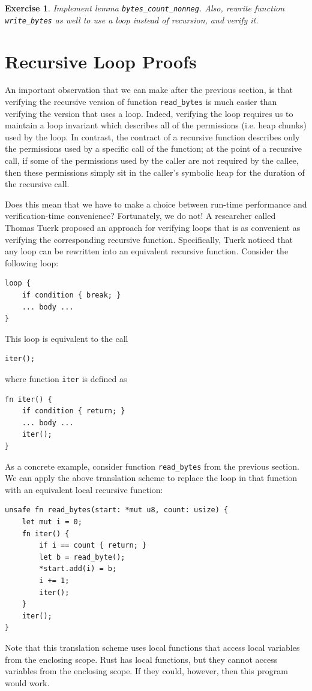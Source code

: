 \documentclass{article}
\newtheorem{exercise}{Exercise}
\begin{document}
\begin{exercise}\label{exercise:bytes_loop}
Implement lemma \lstinline|bytes_count_nonneg|. Also, rewrite function \lstinline!write_bytes! as well to use a loop instead of recursion, and verify it.
\end{exercise}

\section{Recursive Loop Proofs}\label{section:recursive-loop-proofs}

An important observation that we can make after the previous section, is that verifying the recursive version of function \lstinline!read_bytes!
is much easier than verifying the version that uses a loop. Indeed, verifying the loop requires us to maintain a loop invariant which describes all of
the permissions (i.e. heap chunks) used by the loop. In contrast, the contract of a recursive function describes only the permissions used by a
specific call of the function; at the point of a recursive call, if some of the permissions used by the caller are not required by the callee,
then these permissions simply sit in the caller's symbolic heap for the duration of the recursive call.

Does this mean that we have to make a choice between run-time performance and verification-time convenience? Fortunately, we do not! A researcher called
Thomas Tuerk proposed an approach for verifying loops that is as convenient as verifying the corresponding recursive function. Specifically,
Tuerk noticed that any loop can be rewritten into an equivalent recursive function. Consider the following loop:
\begin{lstlisting}
loop {
    if condition { break; }
    ... body ...
}
\end{lstlisting}
This loop is equivalent to the call
\begin{lstlisting}
iter();
\end{lstlisting}
where function \lstinline!iter! is defined as
\begin{lstlisting}
fn iter() {
    if condition { return; }
    ... body ...
    iter();
}
\end{lstlisting}
As a concrete example, consider function \lstinline!read_bytes! from the previous section.
We can apply the above translation scheme to replace the loop in that function with an equivalent local recursive function:
\begin{lstlisting}
unsafe fn read_bytes(start: *mut u8, count: usize) {
    let mut i = 0;
    fn iter() {
        if i == count { return; }
        let b = read_byte();
        *start.add(i) = b;
        i += 1;
        iter();
    }
    iter();
}
\end{lstlisting}
Note that this translation scheme uses local functions that access local variables from the enclosing scope. Rust has local functions, but they cannot access variables from the enclosing scope. If they could, however, then this program would work.
\end{document}
